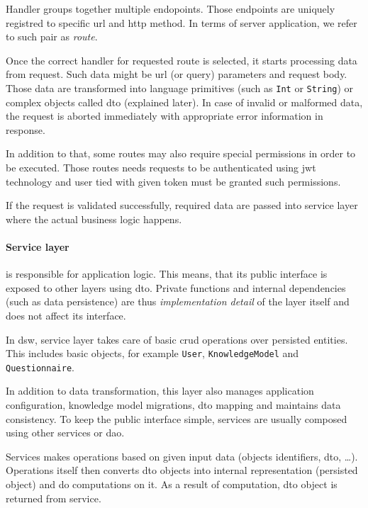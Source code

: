 Handler groups together multiple endopoints.
Those endpoints are uniquely registred to specific \gls{url} and \gls{http} method.
In terms of server application, we refer to such pair as \textit{route}.


Once the correct handler for requested route is selected, it starts processing data from request.
Such data might be \gls{url} (or query) parameters and request body.
Those data are transformed into language primitives (such as \texttt{Int} or \texttt{String}) or complex objects called \gls{dto} (explained later).
In case of invalid or malformed data, the request is aborted immediately with appropriate error information in response.

In addition to that, some routes may also require special permissions in order to be executed.
Those routes needs requests to be authenticated using \gls{jwt} technology and user tied with given token must be granted such permissions.

If the request is validated successfully, required data are passed into service layer where the actual business logic happens.

\paragraph*{Service layer} is responsible for application logic.
This means, that its public interface is exposed to other layers using \gls{dto}.
Private functions and internal dependencies (such as data persistence) are thus \textit{implementation detail} of the layer itself and does not affect its interface.

In \gls{dsw}, service layer takes care of basic \gls{crud} operations over persisted entities.
This includes basic objects, for example \texttt{User}, \texttt{KnowledgeModel} and \texttt{Questionnaire}.

In addition to data transformation, this layer also manages application configuration, knowledge model migrations, \gls{dto} mapping and maintains data consistency.
To keep the public interface simple, services are usually composed using other services or \gls{dao}.

Services makes operations based on given input data (objects identifiers, \gls{dto}, \dots).
Operations itself then converts \gls{dto} objects into internal representation (persisted object) and do computations on it.
As a result of computation, \gls{dto} object is returned from service.

